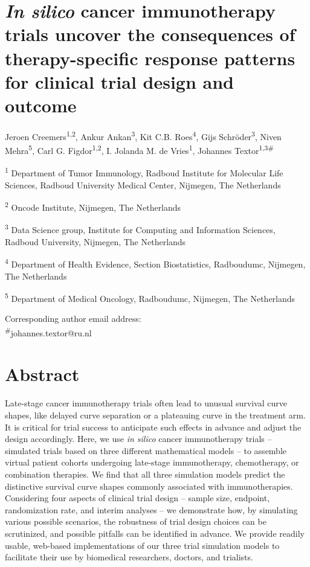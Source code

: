 \documentclass[a4paper,10pt]{article}
\date{\today}
\begin{document}
\section*{\emph{In silico} cancer immunotherapy trials uncover the consequences of therapy-specific response
 patterns for clinical trial design and outcome}

Jeroen Creemers\textsuperscript{1,2},
Ankur Ankan\textsuperscript{3},
Kit C.B. Roes\textsuperscript{4}, Gijs Schr\"oder\textsuperscript{3},
Niven Mehra\textsuperscript{5}, Carl G. Figdor\textsuperscript{1,2}, 
I. Jolanda M. de Vries\textsuperscript{1},
Johannes Textor\textsuperscript{1,3\#}

\textsuperscript{1} Department of Tumor Immunology, Radboud Institute
for Molecular Life Sciences, Radboud University Medical Center,
Nijmegen, The Netherlands

\textsuperscript{2} Oncode Institute, Nijmegen, The Netherlands

\textsuperscript{3} Data Science group,
Institute for Computing and Information Sciences,
Radboud University,
Nijmegen, The Netherlands

\textsuperscript{4} Department of Health Evidence, Section Biostatistics, Radboudumc, Nijmegen, The Netherlands

\textsuperscript{5} Department of Medical Oncology, Radboudumc, Nijmegen, The Netherlands

Corresponding author email address: \\
\textsuperscript{\#}johannes.textor@ru.nl


\section*{Abstract}


Late-stage cancer immunotherapy trials often lead to unusual survival curve shapes, like delayed curve separation or a plateauing curve in the treatment arm. It is critical for trial success to anticipate such effects in advance and adjust the design accordingly. Here, we use \emph{in silico} cancer immunotherapy trials – simulated trials based on three different mathematical models – to assemble virtual patient cohorts undergoing late-stage immunotherapy, chemotherapy, or combination therapies. We find that all three simulation models predict the distinctive survival curve shapes commonly associated with immunotherapies. Considering four aspects of clinical trial design – sample size, endpoint, randomization rate, and interim analyses – we demonstrate how, by simulating various possible scenarios, the robustness of trial design choices can be scrutinized, and possible pitfalls can be identified in advance. We provide readily usable, web-based implementations of our three trial simulation models to facilitate their use by biomedical researchers, doctors, and trialists. 
\end{document}
